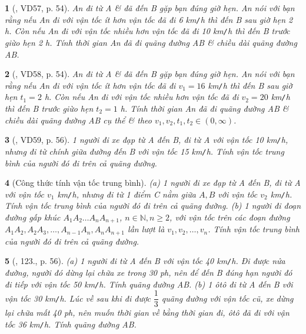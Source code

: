 \documentclass{article}
\newtheorem{baitoan}{}
\begin{document}
\begin{baitoan}[\cite{Binh_Toan_6_tap_2}, VD57, p. 54]
	An đi từ A \& đã đến B gặp bạn đúng giờ hẹn. An nói với bạn rằng nếu An đi với vận tốc ít hơn vận tốc đã đi {\rm6 km{\tt/}h} thì đến B sau giờ hẹn {\rm2 h}. Còn nếu An đi với vận tốc nhiều hơn vận tốc đã đi {\rm10 km{\tt/}h} thì đến B trước giừo hẹn {\rm2 h}. Tính thời gian An đã đi quãng đường AB \& chiều dài quãng đường AB.
\end{baitoan}

\begin{baitoan}[\cite{Binh_Toan_6_tap_2}, VD58, p. 54]
	An đi từ A \& đã đến B gặp bạn đúng giờ hẹn. An nói với bạn rằng nếu An đi với vận tốc ít hơn vận tốc đã đi $v_1 = 16$ {\rm km{\tt/}h} thì đến B sau giờ hẹn $t_1 = 2$ {\rm h}. Còn nếu An đi với vận tốc nhiều hơn vận tốc đã đi $v_2 = 20$ {\rm km{\tt/}h} thì đến B trước giừo hẹn $t_2 = 1$ {\rm h}. Tính thời gian An đã đi quãng đường AB \& chiều dài quãng đường AB cụ thể \& theo $v_1,v_2,t_1,t_2\in(0,\infty)$.
\end{baitoan}

\begin{baitoan}[\cite{Binh_Toan_6_tap_2}, VD59, p. 56]
	1 người đi xe đạp từ A đến B, đi từ A với vận tốc {\rm10 km{\tt/}h}, nhưng đi từ chính giữa đường đến B với vận tốc {\rm15 km{\tt/}h}. Tính vận tốc trung bình của người đó đi trên cả quãng đường.
\end{baitoan}

\begin{baitoan}[Công thức tính vận tốc trung bình]
	(a) 1 người đi xe đạp từ A đến B, đi từ A với vận tốc $v_1$ {\rm km{\tt/}h}, nhưng đi từ 1 điểm C nằm giữa $A,B$ với vận tốc $v_2$ {\rm km{\tt/}h}. Tính vận tốc trung bình của người đó đi trên cả quãng đường. (b) 1 người đi đoạn đường gấp khúc $A_1A_2\ldots A_nA_{n+1}$, $n\in\mathbb{N},n\ge2$, với vận tốc trên các đoạn đường $A_1A_2,A_2A_3,\ldots,A_{n-1}A_n,A_nA_{n+1}$ lần lượt là $v_1,v_2,\ldots,v_n$. Tính vận tốc trung bình của người đó đi trên cả quãng đường.
\end{baitoan}

\begin{baitoan}[\cite{Binh_Toan_6_tap_2}, 123., p. 56]
	(a) 1 người đi từ A đến B với vận tốc {\rm40 km{\tt/}h}. Đi được nửa đường, người đó dừng lại chữa xe trong {\rm30 ph}, nên để đến B đúng hạn người đó đi tiếp với vận tốc {\rm50 km{\tt/}h}. Tính quãng đường AB. (b) 1 ôtô đi từ A đến B với vận tốc {\rm30 km{\tt/}h}. Lúc về sau khi đi được $\dfrac{1}{3}$ quãng đường với vận tốc cũ, xe dừng lại chữa mất {\rm40 ph}, nên muốn thời gian về bằng thời gian đi, ôtô đã đi với vận tốc {\rm36 km{\tt/}h}. Tính quãng đường AB.
\end{baitoan}
\end{document}
